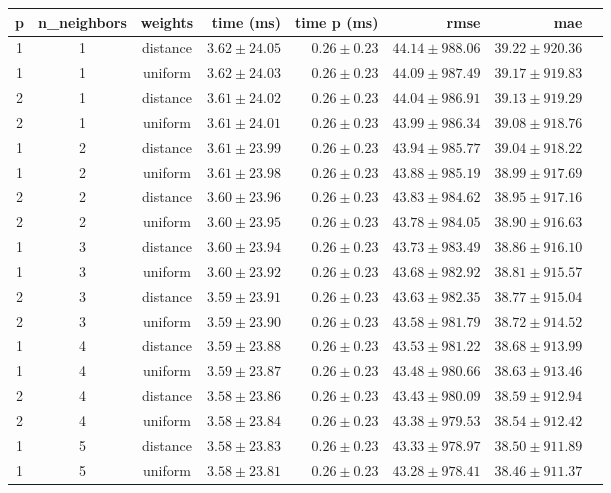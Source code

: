 \begin{tabular}{cccrrrrr}
\toprule
\textbf{p} & \textbf{n\_neighbors} & \textbf{weights} & \textbf{time (ms)} & \textbf{time p (ms)} & \textbf{rmse} & \textbf{mae}\\
\midrule
1 & 1 & distance & $3.62 \pm 24.05$ & $0.26 \pm 0.23$ & $44.14 \pm 988.06$ & $39.22 \pm 920.36$\\
1 & 1 & uniform & $3.62 \pm 24.03$ & $0.26 \pm 0.23$ & $44.09 \pm 987.49$ & $39.17 \pm 919.83$\\
2 & 1 & distance & $3.61 \pm 24.02$ & $0.26 \pm 0.23$ & $44.04 \pm 986.91$ & $39.13 \pm 919.29$\\
2 & 1 & uniform & $3.61 \pm 24.01$ & $0.26 \pm 0.23$ & $43.99 \pm 986.34$ & $39.08 \pm 918.76$\\
1 & 2 & distance & $3.61 \pm 23.99$ & $0.26 \pm 0.23$ & $43.94 \pm 985.77$ & $39.04 \pm 918.22$\\
1 & 2 & uniform & $3.61 \pm 23.98$ & $0.26 \pm 0.23$ & $43.88 \pm 985.19$ & $38.99 \pm 917.69$\\
2 & 2 & distance & $3.60 \pm 23.96$ & $0.26 \pm 0.23$ & $43.83 \pm 984.62$ & $38.95 \pm 917.16$\\
2 & 2 & uniform & $3.60 \pm 23.95$ & $0.26 \pm 0.23$ & $43.78 \pm 984.05$ & $38.90 \pm 916.63$\\
1 & 3 & distance & $3.60 \pm 23.94$ & $0.26 \pm 0.23$ & $43.73 \pm 983.49$ & $38.86 \pm 916.10$\\
1 & 3 & uniform & $3.60 \pm 23.92$ & $0.26 \pm 0.23$ & $43.68 \pm 982.92$ & $38.81 \pm 915.57$\\
2 & 3 & distance & $3.59 \pm 23.91$ & $0.26 \pm 0.23$ & $43.63 \pm 982.35$ & $38.77 \pm 915.04$\\
2 & 3 & uniform & $3.59 \pm 23.90$ & $0.26 \pm 0.23$ & $43.58 \pm 981.79$ & $38.72 \pm 914.52$\\
1 & 4 & distance & $3.59 \pm 23.88$ & $0.26 \pm 0.23$ & $43.53 \pm 981.22$ & $38.68 \pm 913.99$\\
1 & 4 & uniform & $3.59 \pm 23.87$ & $0.26 \pm 0.23$ & $43.48 \pm 980.66$ & $38.63 \pm 913.46$\\
2 & 4 & distance & $3.58 \pm 23.86$ & $0.26 \pm 0.23$ & $43.43 \pm 980.09$ & $38.59 \pm 912.94$\\
2 & 4 & uniform & $3.58 \pm 23.84$ & $0.26 \pm 0.23$ & $43.38 \pm 979.53$ & $38.54 \pm 912.42$\\
1 & 5 & distance & $3.58 \pm 23.83$ & $0.26 \pm 0.23$ & $43.33 \pm 978.97$ & $38.50 \pm 911.89$\\
1 & 5 & uniform & $3.58 \pm 23.81$ & $0.26 \pm 0.23$ & $43.28 \pm 978.41$ & $38.46 \pm 911.37$\\

\end{tabular}
